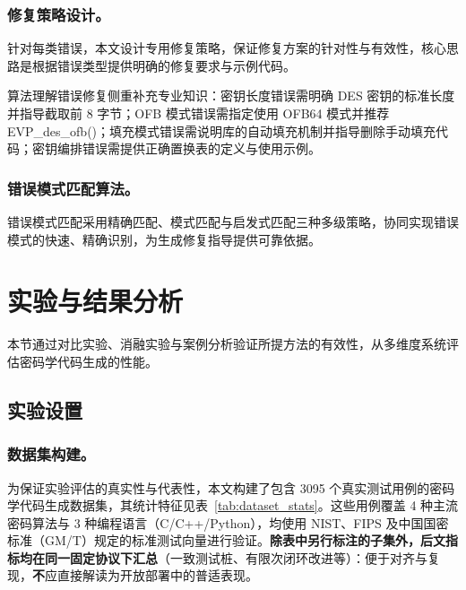 \documentclass[runningheads]{llncs}
\begin{document}
\subsubsection{修复策略设计。}
针对每类错误，本文设计专用修复策略，保证修复方案的针对性与有效性，核心思路是根据错误类型提供明确的修复要求与示例代码。

算法理解错误修复侧重补充专业知识：密钥长度错误需明确 DES 密钥的标准长度并指导截取前 8 字节；OFB 模式错误需指定使用 OFB64 模式并推荐 EVP\_des\_ofb()；填充模式错误需说明库的自动填充机制并指导删除手动填充代码；密钥编排错误需提供正确置换表的定义与使用示例。

\subsubsection{错误模式匹配算法。}
错误模式匹配采用精确匹配、模式匹配与启发式匹配三种多级策略，协同实现错误模式的快速、精确识别，为生成修复指导提供可靠依据。

\section{实验与结果分析}
本节通过对比实验、消融实验与案例分析验证所提方法的有效性，从多维度系统评估密码学代码生成的性能。

\subsection{实验设置}
\subsubsection{数据集构建。}
\label{subsec:eval_protocol}
为保证实验评估的真实性与代表性，本文构建了包含 3095 个真实测试用例的密码学代码生成数据集，其统计特征见表~\ref{tab:dataset_stats}。这些用例覆盖 4 种主流密码算法与 3 种编程语言（C/C++/Python），均使用 NIST、FIPS 及中国国密标准（GM/T）规定的标准测试向量进行验证。\textbf{除表中另行标注的子集外，后文指标均在同一固定协议下汇总}（一致测试桩、有限次闭环改进等）：便于对齐与复现，\textbf{不}应直接解读为开放部署中的普适表现。
\end{document}
